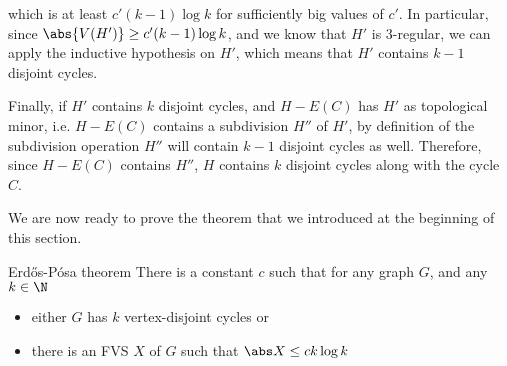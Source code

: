 \documentclass[a4paper, 12pt]{report}
\begin{document}
{        which is at least $c'(k - 1) \log k$ for sufficiently big values of $c'$. In particular, since $\abs{V(H')} \ge c' (k - 1) \log k$, and we know that $H'$ is 3-regular, we can apply the inductive hypothesis on $H'$, which means that $H'$ contains $k - 1$ disjoint cycles.

        Finally, if $H'$ contains $k$ disjoint cycles, and $H - E(C)$ has $H'$ as topological minor, i.e. $H - E(C)$ contains a subdivision $H''$ of $H'$, by definition of the subdivision operation $H''$ will contain $k -1$ disjoint cycles as well. Therefore, since $H - E(C)$ contains $H''$, $H$ contains $k$ disjoint cycles along with the cycle $C$.
    }

    We are now ready to prove the theorem that we introduced at the beginning of this section.

    \begin{framedthm}{Erdős-Pósa theorem}
        There is a constant $c$ such that for any graph $G$, and any $k \in \N$

        \begin{itemize}
            \item either $G$ has $k$ vertex-disjoint cycles or
            \item there is an FVS $X$ of $G$ such that $\abs X \le c k\log k$
        \end{itemize}
    \end{framedthm}
\end{document}
